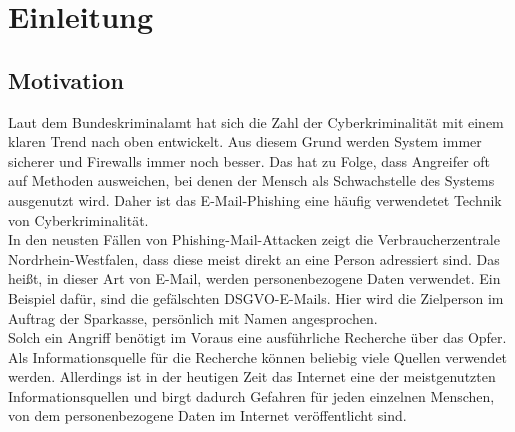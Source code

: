 \chapter{Einleitung}
\label{cha:einleitung}


\section{Motivation}
\label {sec:Motivation}
Laut dem Bundeskriminalamt hat sich die Zahl der Cyberkriminalität mit einem klaren Trend nach oben entwickelt. \cite{Cyberkriminalitaet} Aus diesem Grund werden System immer sicherer und Firewalls immer noch besser. Das hat zu Folge, dass Angreifer oft auf Methoden ausweichen, bei denen der Mensch als Schwachstelle des Systems ausgenutzt wird. Daher ist das E-Mail-Phishing eine häufig verwendetet Technik von Cyberkriminalität.\\
In den neusten Fällen von Phishing-Mail-Attacken zeigt die Verbraucherzentrale Nordrhein-Westfalen, dass diese meist direkt an eine Person adressiert sind. Das heißt, in dieser Art von E-Mail, werden personenbezogene Daten verwendet. Ein Beispiel dafür, sind die gefälschten DSGVO-E-Mails. Hier wird die Zielperson im Auftrag der Sparkasse, persönlich mit Namen angesprochen. \cite{VerbraucherzentraleNW} \\
Solch ein Angriff benötigt im Voraus eine ausführliche Recherche über das Opfer. Als Informationsquelle für die Recherche können beliebig viele Quellen verwendet werden. Allerdings ist in der heutigen Zeit das Internet eine der meistgenutzten Informationsquellen und birgt dadurch Gefahren für jeden einzelnen Menschen, von dem personenbezogene Daten im Internet veröffentlicht sind.\cite{Inforamtionsquellen}\\

